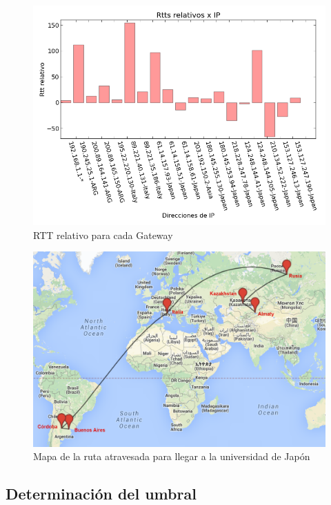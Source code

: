 \begin{figure}[H]
	\begin{center}
		  \includegraphics[scale=0.5]{../graficos_informe/jsc_rtt.png}
		  \caption{RTT relativo para cada Gateway}
		  \label{fig:contra1}
	\end{center}
\end{figure}

\begin{figure}[H]
	\begin{center}
		  \includegraphics[scale=0.4]{../mapas/mapa_aipet.png}
		  \caption{Mapa de la ruta atravesada para llegar a la universidad de Japón}
		  \label{fig:contra1}
	\end{center}
\end{figure}

\subsection{Determinación del umbral}

